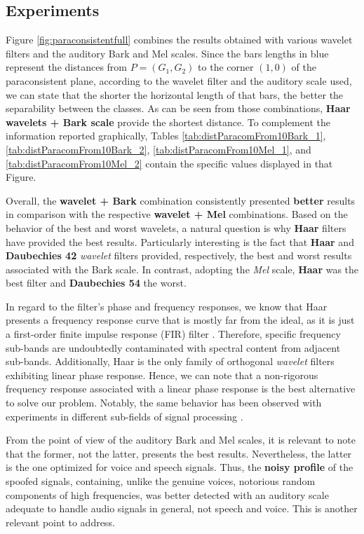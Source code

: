 \subsection{Experiments}
	\par Figure \ref{fig:paraconsistentfull} combines the results obtained with various wavelet filters and the auditory Bark and Mel scales. Since the bars lengths in blue represent the distances from $P=(G_1,G_2)$ to the corner $(1,0)$ of the paraconsistent plane, according to the wavelet filter and the auditory scale used, we can state that the shorter the horizontal length of that bars, the better the separability between the classes. As can be seen from those combinations, \textbf{Haar wavelets + Bark scale} provide the shortest distance. To complement the information reported graphically, Tables \ref{tab:distParacomFrom10Bark_1}, \ref{tab:distParacomFrom10Bark_2}, \ref{tab:distParacomFrom10Mel_1}, and \ref{tab:distParacomFrom10Mel_2} contain the specific values displayed in that Figure.
	\\
	\par Overall, the \textbf{wavelet + Bark} combination consistently presented \textbf{better} results in comparison with the respective \textbf{wavelet + Mel} combinations. Based on the behavior of the best and worst wavelets, a natural question is why \textbf{Haar} filters have provided the best results. Particularly interesting is the fact that \textbf{Haar} and \textbf{Daubechies 42} \textit{wavelet} filters provided, respectively, the best and worst results associated with the Bark scale. In contrast, adopting the \textit{Mel} scale, \textbf{Haar} was the best filter and \textbf{Daubechies 54} the worst.
	\\
	\par In regard to the filter's phase and frequency responses, we know that Haar presents a frequency response curve that is mostly far from the ideal, as it is just a first-order finite impulse response (FIR) filter \cite{WaveletPropertiesBrowser}. Therefore, specific frequency sub-bands are undoubtedly contaminated with spectral content from adjacent sub-bands. Additionally, Haar is the only family of orthogonal \textit{wavelet} filters exhibiting linear phase response. Hence, we can note that a non-rigorous frequency response associated with a linear phase response is the best alternative to solve our problem. Notably, the same behavior has been observed with experiments in different sub-fields of signal processing \cite{guido2}\cite{guido3}\cite{guido4}. 
	\\
	\par From the point of view of the auditory Bark and Mel scales, it is relevant to note that the former, not the latter, presents the best results. Nevertheless, the latter is the one optimized for voice and speech signals. Thus, the \textbf{noisy profile} of the spoofed signals, containing, unlike the genuine voices, notorious random components of high frequencies, was better detected with an auditory scale adequate to handle audio signals in general, not speech and voice. This is another relevant point to address. 
	
